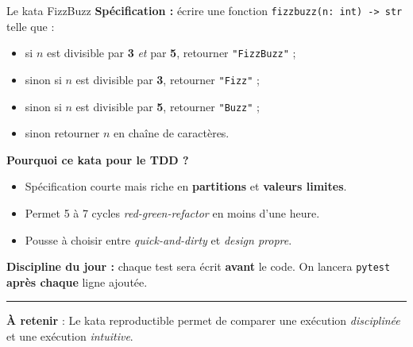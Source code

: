 \documentclass[aspectratio=169,11pt]{beamer}
\newcommand{\takeaway}[1]{%
\vfill\begin{beamercolorbox}[wd=\linewidth,sep=0.4em]{}
\color{accent2}\rule[0.6ex]{1.2em}{1.2pt}\hspace{0.4em}%
\textbf{\color{accent2}\small À retenir} \textcolor{textsoft}{:} %
{\small\color{textmain}#1}
\end{beamercolorbox}}
\begin{document}
\begin{frame}[t]{Le kata FizzBuzz}
\footnotesize
\textbf{Spécification :} écrire une fonction \texttt{fizzbuzz(n: int) -> str} telle que :\\[0.3em]
\begin{itemize}\itemsep0.05em
\item si $n$ est divisible par \textbf{3} \emph{et} par \textbf{5}, retourner \texttt{"FizzBuzz"} ;
\item sinon si $n$ est divisible par \textbf{3}, retourner \texttt{"Fizz"} ;
\item sinon si $n$ est divisible par \textbf{5}, retourner \texttt{"Buzz"} ;
\item sinon retourner $n$ en chaîne de caractères.
\end{itemize}
\vspace{0.4cm}
\textbf{Pourquoi ce kata pour le TDD ?}
\begin{itemize}\itemsep0.05em
\item Spécification courte mais riche en \textbf{partitions} et \textbf{valeurs limites}.
\item Permet 5 à 7 cycles \emph{red-green-refactor} en moins d'une heure.
\item Pousse à choisir entre \emph{quick-and-dirty} et \emph{design propre}.
\end{itemize}
\vspace{0.4cm}
\textbf{Discipline du jour :} chaque test sera écrit \textbf{avant} le code. On lancera \texttt{pytest} \textbf{après chaque} ligne ajoutée.
\takeaway{Le kata reproductible permet de comparer une exécution \emph{disciplinée} et une exécution \emph{intuitive}.}
\end{frame}
\end{document}
